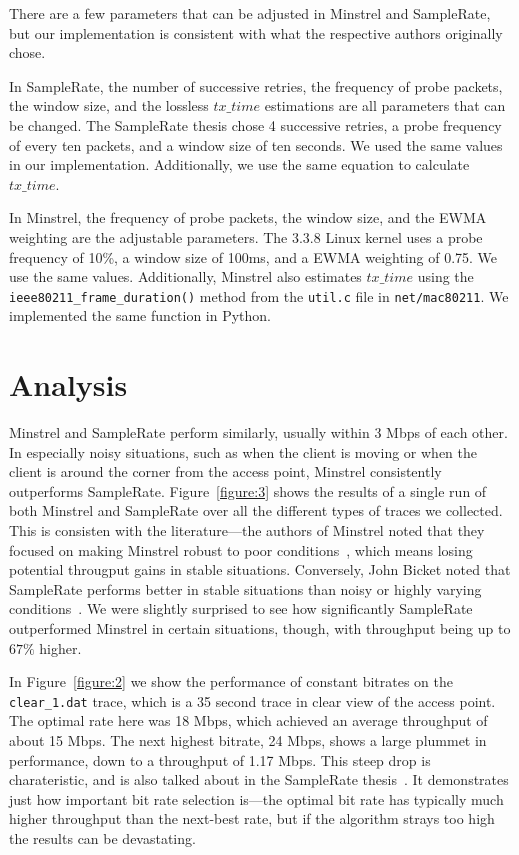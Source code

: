 \documentclass[letterpaper,twocolumn,10pt]{article}
\begin{document}
There are a few parameters that can be adjusted in Minstrel and SampleRate, but our implementation is consistent with what the respective authors originally chose. 

In SampleRate, the number of successive retries, the frequency of probe packets, the window size, and the lossless $tx\_time$ estimations are all parameters that can be changed. The SampleRate thesis chose 4 successive retries, a probe frequency of every ten packets, and a window size of ten seconds. We used the same values in our implementation. Additionally, we use the same equation to calculate $tx\_time$.

In Minstrel, the frequency of probe packets, the window size, and the EWMA weighting are the adjustable parameters. The 3.3.8 Linux kernel uses a probe frequency of 10\%, a window size of 100ms, and a EWMA weighting of 0.75. We use the same values. Additionally, Minstrel also estimates $tx\_time$ using the \texttt{ieee80211\_frame\_duration()} method from the \texttt{util.c} file in \texttt{net/mac80211}. We implemented the same function in Python.


\section{Analysis} \label{sec:analysis}

Minstrel and SampleRate perform similarly, usually within 3 Mbps of each other. In especially noisy situations, such as when the client is moving or when the client is around the corner from the access point, Minstrel consistently outperforms SampleRate. Figure~\ref{figure:3} shows the results of a single run of both Minstrel and SampleRate over all the different types of traces we collected. This is consisten with the literature---the authors of Minstrel noted that they focused on making Minstrel robust to poor conditions~\cite{minstrel}, which means losing potential througput gains in stable situations. Conversely, John Bicket noted that SampleRate performs better in stable situations than noisy or highly varying conditions~\cite{samplerate}. We were slightly surprised to see how significantly SampleRate outperformed Minstrel in certain situations, though, with throughput being up to $67\%$ higher. 

In Figure~\ref{figure:2} we show the performance of constant bitrates on the \texttt{clear\_1.dat} trace, which is a 35 second trace in clear view of the access point. The optimal rate here was 18 Mbps, which achieved an average throughput of about 15 Mbps. The next highest bitrate, 24 Mbps, shows a large plummet in performance, down to a throughput of 1.17 Mbps. This steep drop is charateristic, and is also talked about in the SampleRate thesis~\cite{samplerate}. It demonstrates just how important bit rate selection is---the optimal bit rate has typically much higher throughput than the next-best rate, but if the algorithm strays too high the results can be devastating. 
\end{document}
